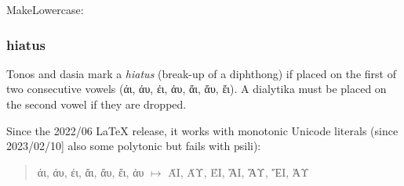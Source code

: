 \documentclass[a4paper]{article}
\begin{document}
MakeLowercase:
\begin{quote}
  \MakeLowercase{\GreekExtended}
\end{quote}

%
%
%
%
%
%
%
%


\subsubsection{hiatus}

Tonos and dasia mark a \emph{hiatus} (break-up of a diphthong) if placed on
the first of two consecutive vowels (άι, άυ, έι, ἀυ, ἄι, ἄυ, ἔι).
A dialytika must be placed on the second vowel if they are dropped.

Since the 2022/06 LaTeX release, it works with monotonic Unicode literals
(since 2023/02/10] also some polytonic but fails with psili):
\begin{quote}
  \newcommand*{\hiatest}{άι, άυ, έι, ἄι, ἄυ, ἔι, ἀυ}
  \hiatest{} $\mapsto$ \MakeUppercase{\hiatest}
\end{quote}
\end{document}

